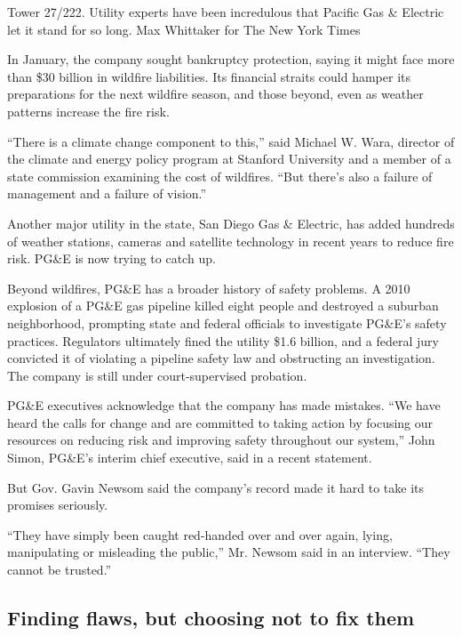 Tower 27/222. Utility experts have been incredulous that Pacific Gas \&
Electric let it stand for so long. Max Whittaker for The New York Times

In January, the company sought bankruptcy protection, saying it might
face more than \$30 billion in wildfire liabilities. Its financial
straits could hamper its preparations for the next wildfire season, and
those beyond, even as weather patterns increase the fire risk.

``There is a climate change component to this,'' said Michael W. Wara,
director of the climate and energy policy program at Stanford University
and a member of a state commission examining the cost of wildfires.
``But there's also a failure of management and a failure of vision.''

Another major utility in the state, San Diego Gas \& Electric, has added
hundreds of weather stations, cameras and satellite technology in recent
years to reduce fire risk. PG\&E is now trying to catch up.

Beyond wildfires, PG\&E has a broader history of safety problems. A 2010
explosion of a PG\&E gas pipeline killed eight people and destroyed a
suburban neighborhood, prompting state and federal officials to
investigate PG\&E's safety practices. Regulators ultimately fined the
utility \$1.6 billion, and a federal jury convicted it of violating a
pipeline safety law and obstructing an investigation. The company is
still under court-supervised probation.

PG\&E executives acknowledge that the company has made mistakes. ``We
have heard the calls for change and are committed to taking action by
focusing our resources on reducing risk and improving safety throughout
our system,'' John Simon, PG\&E's interim chief executive, said in a
recent statement.

But Gov. Gavin Newsom said the company's record made it hard to take its
promises seriously.

``They have simply been caught red-handed over and over again, lying,
manipulating or misleading the public,'' Mr. Newsom said in an
interview. ``They cannot be trusted.''

\hypertarget{finding-flaws-but-choosing-not-to-fix-them}{%
\subsection{Finding flaws, but choosing not to fix
them}\label{finding-flaws-but-choosing-not-to-fix-them}}

